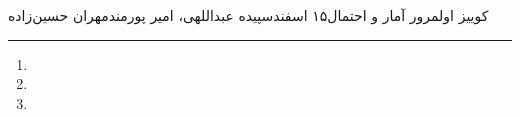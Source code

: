




	\def\ci{\perp\!\!\!\perp}
	
	\header
	{کوییز اول}{مرور آمار و احتمال}{۱۵ اسفند}{سپیده عبداللهی، امیر پورمند}{مهران حسین‌زاده}
	
		\hrule
	\begin{enumerate}
		\item 
		\item 
		\item 
	
	\end{enumerate}
	
	\vspace{0.5cm}	

